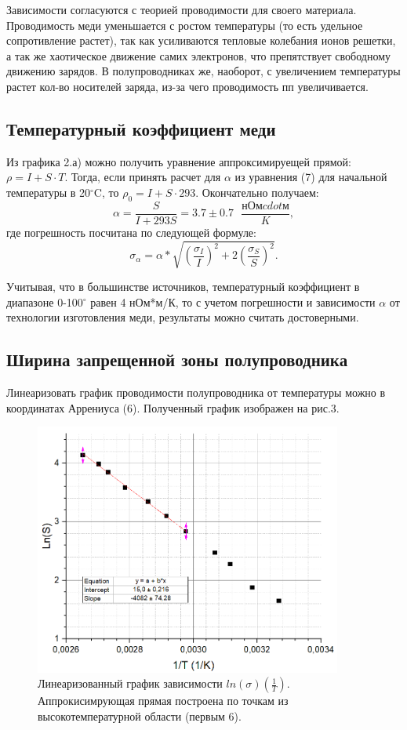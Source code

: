 \documentclass[a4paper, 14pt]{extarticle}%
\newcommand\ECaption[1]{%
     \captionsetup{font=footnotesize}%
     \caption{#1}}
\begin{document}
Зависимости согласуются с теорией проводимости для своего материала. Проводимость меди уменьшается с ростом температуры (то есть удельное сопротивление растет), так как усиливаются тепловые колебания ионов решетки, а так же хаотическое движение самих электронов, что препятствует свободному движению зарядов. В полупроводниках же, наоборот, с увеличением температуры растет кол-во носителей заряда, из-за чего проводимость пп увеличивается.
\subsection*{Температурный коэффициент меди}

Из графика 2.а) можно получить уравнение аппроксимируещей прямой: $ \rho = I + S\cdot T  $. Тогда, если принять расчет для $\alpha$ из уравнения (7) для начальной температуры в 20$^{\circ}$C, то $\rho_0 = I+S\cdot 293$. Окончательно получаем:
\[\alpha = \dfrac{S}{I+293S} = 3.7 \pm 0.7 \text{ }\frac{\text{нОм}cdot\text{м}}{K},\]
где погрешность посчитана по следующей формуле:
\[\sigma_{\alpha} = \alpha*\sqrt{\left( \frac{\sigma_I}{I}\right)^2 + 2\left(\frac{\sigma_S}{S} \right)^2}. \]

Учитывая, что в большинстве источников, температурный коэффициент в диапазоне 0-100$^{\circ}$ равен 4 нОм*м/К, то с учетом погрешности и зависимости $\alpha$ от технологии изготовления меди, результаты можно считать достоверными.

\subsection*{Ширина запрещенной зоны полупроводника}

Линеаризовать график проводимости полупроводника от температуры можно в координатах Аррениуса (6). Полученный график изображен на рис.3.

\begin{figure}[h]
\begin{center}
\includegraphics[width=0.9\textwidth]{gr3}
\end{center}
\ECaption{Линеаризованный график зависимости $ln(\sigma)\left( \frac{1}{T}\right)$. Аппрокисимрующая прямая построена по точкам из высокотемпературной области (первым 6). }
\end{figure}
\end{document}
